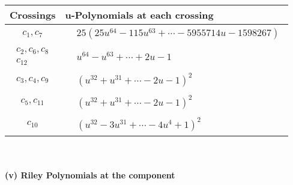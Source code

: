 \documentclass[1p]{elsarticle_modified}
\theoremstyle{definition}
\begin{document}
\begin{tabular}{m{50pt}|m{274pt}}
Crossings & \hspace{64pt}u-Polynomials at each crossing \\
\hline $$\begin{aligned}c_{1},c_{7}\end{aligned}$$&$\begin{aligned}
&25(25 u^{64}-115 u^{63}+\cdots-5955714 u-1598267)
\end{aligned}$\\
\hline $$\begin{aligned}c_{2},c_{6},c_{8}\\c_{12}\end{aligned}$$&$\begin{aligned}
&u^{64}- u^{63}+\cdots+2 u-1
\end{aligned}$\\
\hline $$\begin{aligned}c_{3},c_{4},c_{9}\end{aligned}$$&$\begin{aligned}
&(u^{32}+u^{31}+\cdots-2 u-1)^{2}
\end{aligned}$\\
\hline $$\begin{aligned}c_{5},c_{11}\end{aligned}$$&$\begin{aligned}
&(u^{32}+u^{31}+\cdots-2 u-1)^{2}
\end{aligned}$\\
\hline $$\begin{aligned}c_{10}\end{aligned}$$&$\begin{aligned}
&(u^{32}-3 u^{31}+\cdots-4 u^4+1)^{2}
\end{aligned}$\\
\hline
\end{tabular}\\~\\
\newpage\renewcommand{\arraystretch}{1}
\flushleft \textbf{(v) Riley Polynomials at the component}\newline \\
\end{document}
